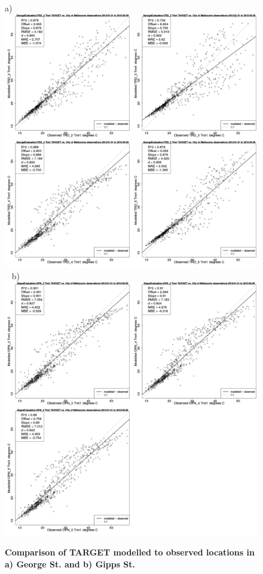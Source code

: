 \documentclass[final,3p,times,authoryear]{elsarticle}
\begin{document}
\begin{figure}[!htbp]
a) \includegraphics[scale=0.15]{images/Eval/GeorgeEvaluation-ErrorPlots-Tmrt.png}
~ b)
\includegraphics[scale=0.15]{images/Eval/GippsEvaluation-ErrorPlots-Tmrt.png}

\caption{\bf Comparison of TARGET modelled  to observed locations in a) George St. and b) Gipps St.}    
 \label{fig:tmrteval} 
\end{figure} 
\end{document}
